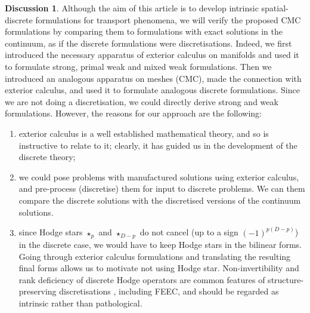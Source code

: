 \documentclass{elsarticle}
\theoremstyle{definition}
\newtheorem{discussion}[theorem]{Discussion}
\begin{document}
\begin{discussion}
  Although the aim of this article is to develop intrinsic spatial-discrete formulations for transport phenomena, we will verify the proposed CMC formulations by comparing them to formulations with exact solutions in the continuum, as if the discrete formulations were discretisations.
  Indeed, we first introduced the necessary apparatus of exterior calculus on manifolds and used it to formulate strong, primal weak and mixed weak formulations.
  Then we introduced an analogous apparatus on meshes (CMC), made the connection with exterior calculus, and used it to formulate analogous discrete formulations.
  Since we are not doing a discretisation, we could directly derive strong and weak formulations.
  However, the reasons for our approach are the following:
  \begin{enumerate}
    \item
      exterior calculus is a well established mathematical theory, and so is instructive to relate to it; clearly, it has guided us in the development of the discrete theory;
    \item
      we could pose problems with manufactured solutions using exterior calculus, and pre-process (discretise) them for input to discrete problems.
      We can them compare the discrete solutions with the discretised versions of the continuum solutions.
    \item
      since Hodge stars $\star_p$ and $\star_{D - p}$ do not cancel (up to a sign $(-1)^{p (D - p)}$) in the discrete case, we would have to keep Hodge stars in the bilinear forms.
      Going through exterior calculus formulations and translating the resulting final forms allows us to motivate not using Hodge star.
      Non-invertibility and rank deficiency of discrete Hodge operators are
      common features of structure-preserving discretisations
      \cite{hiptmair2001discrete}, including FEEC, and should be regarded as
      intrinsic rather than pathological.
  \end{enumerate}
\end{discussion}
\end{document}
